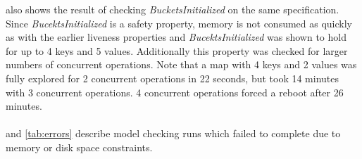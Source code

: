 \documentclass{uit-thesis}
\begin{document}
 also shows the result of checking \textit{BucketsInitialized} on the same specification. Since \textit{BucektsInitialized} is a safety property, memory is not consumed as quickly as with the earlier liveness properties and \textit{BucektsInitialized} was shown to hold for up to 4 keys and 5 values. Additionally this property was checked for larger numbers of concurrent operations. Note that a map with 4 keys and 2 values was fully explored for 2 concurrent operations in 22 seconds, but took 14 minutes with 3 concurrent operations. 4 concurrent operations forced a reboot after 26 minutes.
\\\\
 and \ref{tab:errors} describe model checking runs which failed to complete due to memory or disk space constraints.
\begin{table}
    \centering
    \caption{Model checking SOConcurrent with operation IDs}
    \label{tab:SOConcurrent_ID}
\end{table}
\end{document}
